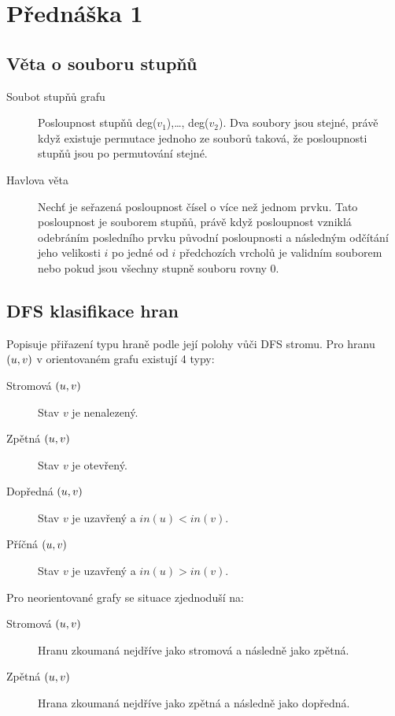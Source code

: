 \section{Přednáška 1}

\subsection{Věta o souboru stupňů}

\begin{description}
    \item[Soubot stupňů grafu] Posloupnost stupňů deg($v_1$),\ldots, deg($v_2$).
    Dva soubory jsou stejné, právě když existuje permutace jednoho ze souborů taková, že posloupnosti stupňů jsou po permutování stejné.
    \item[Havlova věta] Nechť  je seřazená posloupnost čísel o více než jednom prvku.
    Tato posloupnost je souborem stupňů, právě když posloupnost vzniklá odebráním posledního prvku původní posloupnosti a následným odčítání jeho velikosti $i$ po jedné od $i$ předchozích vrcholů je validním souborem nebo pokud jsou všechny stupně souboru rovny $0$.

\end{description}

\subsection{DFS klasifikace hran}
 
 Popisuje přiřazení typu hraně podle její polohy vůči DFS stromu. Pro hranu $(u, v)$ v orientovaném grafu existují 4 typy:

 \begin{description}
     \item[Stromová $(u, v)$] Stav $v$ je nenalezený.
     \item[Zpětná $(u, v)$] Stav $v$ je otevřený.
     \item[Dopředná $(u, v)$] Stav $v$ je uzavřený a $in(u) < in(v)$.
     \item[Příčná $(u, v)$] Stav $v$ je uzavřený a $in(u) > in(v)$.
 \end{description}

 Pro neorientované grafy se situace zjednoduší na:

  \begin{description}
     \item[Stromová $(u, v)$] Hranu zkoumaná nejdříve jako stromová a následně jako zpětná.
     \item[Zpětná $(u, v)$] Hrana zkoumaná nejdříve jako zpětná a následně jako dopředná.
 \end{description}

